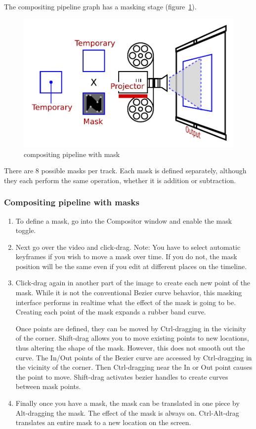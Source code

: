 The compositing pipeline graph has a masking stage (figure~\ref{fig:temporary-02}).

\begin{figure}[htpb]
    \centering
    \includegraphics[width=0.7\linewidth]{images/temporary-02.pdf}
    \caption{compositing pipeline with mask}
    \label{fig:temporary-02}
\end{figure}

There are 8 possible masks per track. Each mask is defined separately, although they each perform the same operation, whether it is addition or subtraction.

\subsubsection*{Compositing pipeline with masks}%
\label{ssub:compositing_pipeline_with_masks}

\begin{enumerate}
    \item To define a mask, go into the Compositor window and enable the mask toggle.
    \item  Next go over the video and click-drag. 
        Note: You have to select automatic keyframes if you wish to move a mask over time.  
        If you do not, the mask position will be the same even if you edit at different places on the timeline.
    \item  Click-drag again in another part of the image to create each new point of the mask. 
        While it is not the conventional Bezier curve behavior, this masking interface performs in realtime what the effect 
        of the mask is going to be. Creating each point of the mask expands a rubber band curve.

        Once points are defined, they can be moved by Ctrl-dragging in the vicinity of the corner. 
        Shift-drag allows you to move existing points to new locations, thus altering the shape of the mask.  
        However, this does not smooth out the curve. 
        The In/Out points of the Bezier curve are accessed by Ctrl-dragging in the vicinity of the corner. 
        Then Ctrl-dragging near the In or Out point causes the point to move.  
        Shift-drag activates bezier handles to create curves between mask points.       

    \item  Finally once you have a mask, the mask can be translated in one piece by Alt-dragging the mask.
    The effect of the mask is always on.  
    Ctrl-Alt-drag translates an entire mask to a new location on the
    screen.
\end{enumerate}

